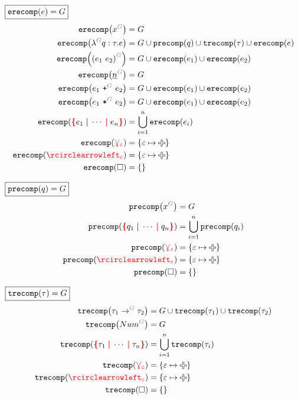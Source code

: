 \noindent $\boxed{\operatorname{\texttt{erecomp}}\mathopen{}\left(e\right)\mathclose{} = G}$
%
\begin{align*}
  \erecomp{\eVar{G}{x}} &= G
  \\
  \erecomp{\eFun{G}{q}{\tau}{e}}
    &= G \cup \precomp{q} \cup \trecomp{\tau} \cup \erecomp{e}
  \\
  \erecomp{\eApp{G}{e_1}{e_2}}
    &= G \cup \erecomp{e_1} \cup \erecomp{e_2}
  \\
  \erecomp{\eNum{G}{n}} &= G
  \\
  \erecomp{\ePlus{G}{e_1}{e_2}}
    &= G \cup \erecomp{e_1} \cup \erecomp{e_2}
  \\
  \erecomp{\eTimes{G}{e_1}{e_2}}
    &= G \cup \erecomp{e_1} \cup \erecomp{e_2}
  \\
  \erecomp{\conflictHole{e_1, \cdots, e_n}}
  &= \bigcup_{i=1}^n \erecomp{e_i}
  \\
  \erecomp{\multiVertex{\e}} &= \SetOf{\e \mapsto \Plus}
  \\
  \erecomp{\cycleVertex{\e}} &= \SetOf{\e \mapsto \Plus}
  \\
  \erecomp{\hole} &= \SetOf{}
\end{align*}

\noindent $\boxed{\operatorname{\texttt{precomp}}\mathopen{}\left(q\right)\mathclose{} = G}$
%
\begin{align*}
  \precomp{\pVar{G}{x}} &= G
  \\
  \precomp{\conflictHole{q_1, \cdots, q_n}} &= \bigcup_{i=1}^n \precomp{q_i}
  \\
  \precomp{\multiVertex{\e}} &= \SetOf{\e \mapsto \Plus}
  \\
  \precomp{\cycleVertex{\e}} &= \SetOf{\e \mapsto \Plus}
  \\
  \precomp{\hole} &= \SetOf{}
\end{align*}

\noindent $\boxed{\operatorname{\texttt{trecomp}}\mathopen{}\left(\tau\right)\mathclose{} = G}$
%
\begin{align*}
  \trecomp{\tArrow{G}{\tau_1}{\tau_2}}
    &= G \cup \trecomp{\tau_1} \cup \trecomp{\tau_2}
  \\
  \trecomp{\tNum{G}} &= G
  \\
  \trecomp{\conflictHole{\tau_1, \cdots, \tau_n}} &= \bigcup_{i=1}^n \trecomp{\tau_i}
  \\
  \trecomp{\multiVertex{\e}} &= \SetOf{\e \mapsto \Plus}
  \\
  \trecomp{\cycleVertex{\e}} &= \SetOf{\e \mapsto \Plus}
  \\
  \trecomp{\hole} &= \SetOf{}
\end{align*}



